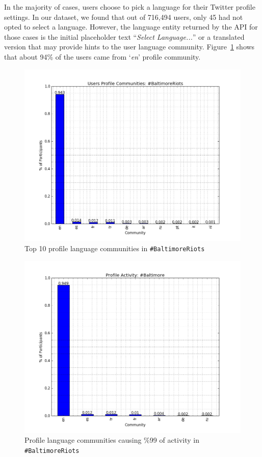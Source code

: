 In the majority of cases, users choose to pick a language for their
Twitter profile settings. In our dataset, we found that out of 716,494
users, only 45 had not opted to select a language. However, the
language entity returned by the API for those cases is the initial
placeholder text ``{\emph{Select Language...}}'' or a translated
version that may provide hints to the user language
community. Figure~\ref{fig:baltimore_profile_size} shows that about
94\% of the users came from `{\emph{en}}' profile community.

\begin{figure}[htb]
\centering
\includegraphics[width=\columnwidth]{images/baltimore_profile_size.png}
\caption{Top 10 profile language communities in {\texttt{\#BaltimoreRiots}}}
\label{fig:baltimore_profile_size}
\end{figure}

\begin{figure}[htb]
\centering
\includegraphics[width=\columnwidth]{images/baltimore_profile_activity.png}
\caption{Profile language communities causing \%99 of activity in {\texttt{\#BaltimoreRiots}}}
\label{fig:baltimore_profile_activity}
\end{figure}

